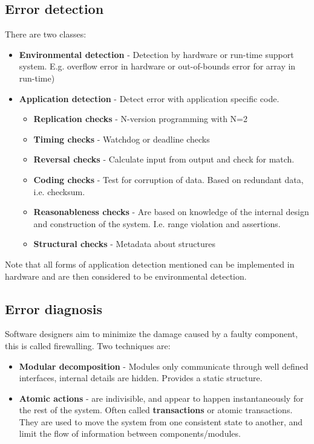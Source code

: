 \subsection{Error detection}
There are two classes:
\begin{itemize}
\item \textbf{Environmental detection} - Detection by hardware or run-time support system. E.g. overflow error in hardware or out-of-bounds error for array in run-time)
\item \textbf{Application detection} - Detect error with application specific code.
\begin{itemize}
    \item \textbf{Replication checks} - N-version programming with N=2
\item \textbf{Timing checks} - Watchdog or deadline checks
\item \textbf{Reversal checks} - Calculate input from output and check for match.
\item \textbf{Coding checks} - Test for corruption of data. Based on redundant data, i.e. checksum.
\item \textbf{Reasonableness checks} - Are based on knowledge of the internal design and construction of the system. I.e. range violation and assertions.
\item \textbf{Structural checks} - Metadata about structures
\end{itemize}
\end{itemize}
Note that all forms of application detection mentioned can be implemented in hardware and are then considered to be environmental detection.

\subsection{Error diagnosis}
Software designers aim to minimize the damage caused by a faulty component, this is called firewalling. Two techniques are:
\begin{itemize}
\item \textbf{Modular decomposition} - Modules only communicate through well defined interfaces, internal details are hidden. Provides a static structure.
\item \textbf{Atomic actions} - are indivisible, and appear to happen instantaneously for the rest of the system. Often called \textbf{transactions} or atomic transactions. They are used to move the system from one consistent state to another, and limit the flow of information between components/modules.
\end{itemize}

